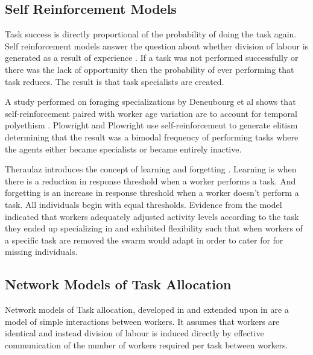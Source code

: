 \subsection{Self Reinforcement Models}
\label{selfreinforcement}

Task success is directly proportional of the probability of doing the task again. Self reinforcement models answer the question about whether division of labour is generated as a result of experience \cite{lerman2005review}. If a task was not performed successfully or there was the lack of opportunity then the probability of ever performing that task reduces. The result is that task specialists are created. 

A study performed on foraging specializations by Deneubourg et al shows that self-reinforcement paired with worker age variation are to account for temporal polyethism \cite{deneubourg1987self}. Plowright and Plowright use self-reinforcement to generate elitism \cite{plowright1988elitism} determining that the result was a bimodal frequency of performing tasks where the agents either became specialists or became entirely inactive.

Theraulaz introduces the concept of learning and forgetting \cite{theraulaz1998response}. Learning is when there is a reduction in response threshold when a worker performs a task. And forgetting is an increase in response threshold when a worker doesn't perform a task. All individuals begin with equal thresholds. Evidence from the model indicated that workers adequately adjusted activity levels according to the task they ended up specializing in and exhibited flexibility such that when workers of a specific task are removed the swarm would adapt in order to cater for for missing individuals. 

                                   
\subsection{Network Models of Task Allocation}

Network models of Task allocation, developed in \cite{gordon1992parallel} and extended upon in \cite{pacala1996effects} are a model of simple interactions between workers. It assumes that workers are identical and instead division of labour is induced directly by effective communication of the number of workers required per task between workers. 
 
